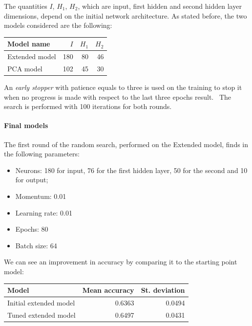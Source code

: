 The quantities $I$, $H_1$, $H_2$, which are input, first hidden and second hidden 
layer dimensions, depend on the initial network architecture.
As stated before, the two models considered are the following: 
\begin{center}
    \begin{tabular}{ |l|r|r|r|} 
        \hline
        Model name & $I$ & $H_1$ & $H_2$ \\
        \hline
        Extended model & 180 & 80 & 46 \\
        PCA model & 102 & 45 & 30 \\
        \hline
    \end{tabular}
\end{center}

An \emph{early stopper} with patience equals to three is used on the training to stop it when no progress is made with 
respect to the last three epochs result.~\cite{early}
The search is performed with 100 iterations for both rounds.

\paragraph{Final models}
The first round of the random search, performed on the Extended model, finds 
in the following parameters:
\begin{itemize}
    \item Neurons: 180 for input, 76 for the first hidden layer, 50 for the second and 10 for output;
    \item Momentum: 0.01
    \item Learning rate: 0.01
    \item Epochs: 80
    \item Batch size: 64
\end{itemize}
We can see an improvement in accuracy by comparing it to the starting point model:
\begin{center}
    \begin{tabular}{ |l|r|r| } 
        \hline
        Model & Mean accuracy & St. deviation \\
        \hline
        Initial extended model & 0.6363 & 0.0494\\
        Tuned extended model & 0.6497 & 0.0431\\
        \hline
    \end{tabular}
\end{center}

